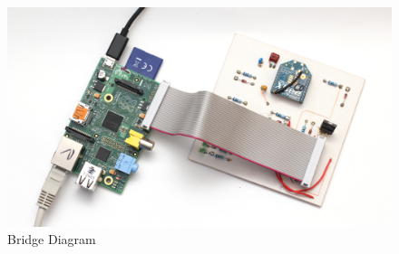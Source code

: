 \begin{figure}[H]
\begin{center}
\includegraphics[width=12cm]{images/photos/edited/master-pi1}
\end{center}
\caption{Bridge Diagram}
\label{fig:Bridge Diagram}
\end{figure}
